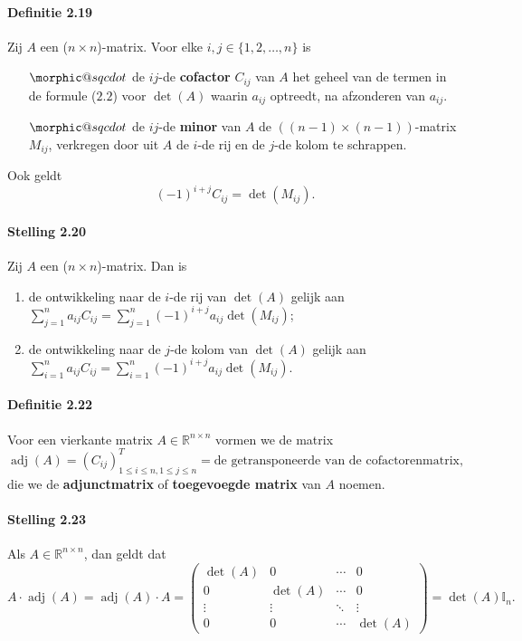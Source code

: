 \documentclass[11pt,oneside,a4paper]{article}
\makeatletter
\DeclareRobustCommand{\sqcdot}{\mathbin{\mathpalette\morphic@sqcdot\relax}}
\newcommand{\morphic@sqcdot}[2]{%
	\sbox\z@{$\m@th#1\centerdot$}%
	\ht\z@=.33333\ht\z@
	\vcenter{\box\z@}%
}
\DeclareMathOperator{\adj}{adj}
\makeatother
\begin{document}
	\paragraph{Definitie 2.19}
		Zij $A$ een ($n\times n$)-matrix. Voor elke $i,j \in \{1,2,\ldots ,n\}$ is
		\begin{itemize}
			\item[$\sqcdot$] de $ij$-de \textbf{cofactor} $C_{ij}$ van $A$ het geheel van de termen in de formule ($2.2$) voor $\det(A)$ waarin $a_{ij}$ optreedt, na afzonderen van $a_{ij}$.
			\item[$\sqcdot$] de $ij$-de \textbf{minor} van $A$ de $((n-1)\times (n-1))$-matrix $M_{ij}$, verkregen door uit $A$ de $i$-de rij en de $j$-de kolom te schrappen.
		\end{itemize}
		Ook geldt $$(-1)^{i+j}C_{ij} = \det(M_{ij}).$$
	\paragraph{Stelling 2.20}
		Zij $A$ een ($n \times n$)-matrix. Dan is
		\begin{enumerate}
			\item de ontwikkeling naar de $i$-de rij van $\det(A)$ gelijk aan $\sum_{j=1}^{n}a_{ij}C_{ij} = \sum_{j=1}^{n}(-1)^{i+j}a_{ij}\det(M_{ij})$;
			\item de ontwikkeling naar de $j$-de kolom van $\det(A)$ gelijk aan $\sum_{i=1}^{n}a_{ij}C_{ij} = \sum_{i=1}^{n}(-1)^{i+j}a_{ij}\det(M_{ij})$.
		\end{enumerate}
	\paragraph{Definitie 2.22}
		Voor een vierkante matrix $A \in \mathbb{R}^{n\times n}$ vormen we de matrix $$\adj(A) = (C_{ij})^T_{1 \le i \le n, 1 \le j \le n} = \text{de getransponeerde van de cofactorenmatrix,}$$
		die we de \textbf{adjunctmatrix} of \textbf{toegevoegde matrix} van $A$ noemen.
	\paragraph{Stelling 2.23}
		Als $A \in \mathbb{R}^{n \times n}$, dan geldt dat
		$$ A\cdot \adj(A) = \adj(A) \cdot A = \begin{pmatrix}
			\det(A) & 0 & \cdots & 0 \\
			0 & \det(A) & \cdots & 0 \\
			\vdots & \vdots & \ddots & \vdots \\
			0 & 0 & \cdots & \det(A)
		\end{pmatrix} = \det(A)\mathbb{I}_n.$$
\end{document}
